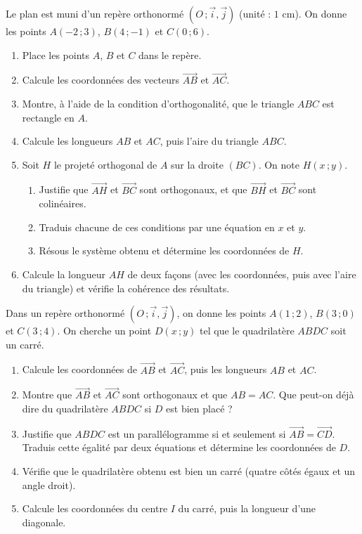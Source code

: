 \documentclass[11pt]{article}
\begin{document}
\begin{exercice}
Le plan est muni d'un repère orthonormé $(O\,;\vec{i},\vec{j})$ (unité : $1$ cm). On donne les points $A(-2\,;3)$, $B(4\,;-1)$ et $C(0\,;6)$.
\begin{enumerate}
\item Place les points $A$, $B$ et $C$ dans le repère.
\item Calcule les coordonnées des vecteurs $\overrightarrow{AB}$ et $\overrightarrow{AC}$.
\item Montre, à l'aide de la condition d'orthogonalité, que le triangle $ABC$ est rectangle en $A$.
\item Calcule les longueurs $AB$ et $AC$, puis l'aire du triangle $ABC$.
\item Soit $H$ le projeté orthogonal de $A$ sur la droite $(BC)$. On note $H(x\,;y)$.
\begin{enumerate}
\item Justifie que $\overrightarrow{AH}$ et $\overrightarrow{BC}$ sont orthogonaux, et que $\overrightarrow{BH}$ et $\overrightarrow{BC}$ sont colinéaires.
\item Traduis chacune de ces conditions par une équation en $x$ et $y$.
\item Résous le système obtenu et détermine les coordonnées de $H$.
\end{enumerate}
\item Calcule la longueur $AH$ de deux façons (avec les coordonnées, puis avec l'aire du triangle) et vérifie la cohérence des résultats.
\end{enumerate}
\end{exercice}

\begin{exercice}
Dans un repère orthonormé $(O\,;\vec{i},\vec{j})$, on donne les points $A(1\,;2)$, $B(3\,;0)$ et $C(3\,;4)$. On cherche un point $D(x\,;y)$ tel que le quadrilatère $ABDC$ soit un carré.
\begin{enumerate}
\item Calcule les coordonnées de $\overrightarrow{AB}$ et $\overrightarrow{AC}$, puis les longueurs $AB$ et $AC$.
\item Montre que $\overrightarrow{AB}$ et $\overrightarrow{AC}$ sont orthogonaux et que $AB = AC$. Que peut-on déjà dire du quadrilatère $ABDC$ si $D$ est bien placé ?
\item Justifie que $ABDC$ est un parallélogramme si et seulement si $\overrightarrow{AB} = \overrightarrow{CD}$. Traduis cette égalité par deux équations et détermine les coordonnées de $D$.
\item Vérifie que le quadrilatère obtenu est bien un carré (quatre côtés égaux et un angle droit).
\item Calcule les coordonnées du centre $I$ du carré, puis la longueur d'une diagonale.
\end{enumerate}
\end{exercice}
\end{document}
